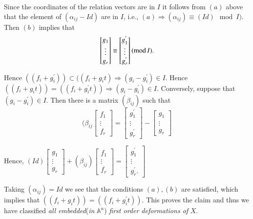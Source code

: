 {Since the coordinates of the relation vectors are in $I$ it follows from $(a)$ above that the element of $(\alpha_{ij}-Id)$ are in $I$, i.e., $(a)\Rightarrow (\alpha_{ij})\equiv(Id)\mod I)$. Then $(b)$ implies that
$$
\begin{bmatrix}
g_1\\
\vdots\\
g_r
\end{bmatrix}\equiv\begin{bmatrix}
g_{1}^{'}\\
\vdots\\
g_{r}^{'}
\end{bmatrix} 
(\text{mod\,} I).
$$

Hence $((f_i+g_{i}^{'}))\subset((f_i+g_it)\Rightarrow(g_i-g_{i}^{'})\in I$. Hence $((f_i+g_it))=((f_i+g_{i}^{'}t))\Rightarrow (g_i-g_{i}^{'})\in I$. Conversely, suppose that $(g_i-g_{i}^{'})\in I$. Then there is a matrix $(\beta_{ij})$ such that
\begin{equation*}
(\beta_{ij}\begin{bmatrix}
f_1\\
\vdots\\
f_r
\end{bmatrix}=\begin{bmatrix}
g_{1}^{'}\\
\vdots\\
g_{r}^{'}
  \end{bmatrix}-\begin{bmatrix}
g_1\\
\vdots\\
g_r
  \end{bmatrix}
\end{equation*}

Hence, $(Id)\begin{bmatrix}
g_1\\
\vdots\\
g_r
\end{bmatrix}+(\beta_{ij})\begin{bmatrix}
f_1\\
\vdots\\
f_r
\end{bmatrix}=\begin{bmatrix}
g_{1}^{'}\\
\vdots\\
g_{r}^{'}.
\end{bmatrix}
$ 

Taking $(\alpha_{ij})=Id$ we see that the conditions $(a), (b)$ are
satisfied, which implies that $((f_i+g_it))=((f_i+g^{'}_{i}t))$. This
proves the claim and thus we have classified {\em all
embedded}\pageoriginale ({\em in} $\mathbb{A}^{n}$) {\em first order
deformations of} $X$. 

}
